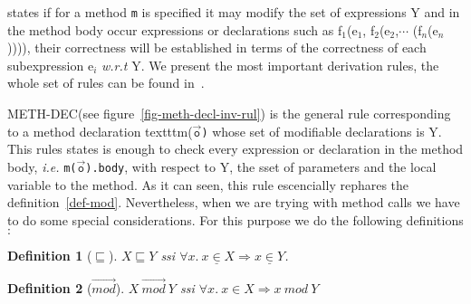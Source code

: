 \documentclass[a4paper]{llncs}
\newtheorem {df}{Definition}
\begin{document}
states if for a method \texttt{m} is specified it may modify the set
of expressions \textsc{Y} and in the method body occur expressions or
declarations such as \textup{f}$_1$\textup{(e}$_1$\textup{,
f}$_2$\textup{(e}$_2$\textup{,}$\cdots$
\textup{(f}$_n$\textup{(e}$_n$\textup{))))}, their correctness will be
established in terms of the correctness of each subexpression
\textup{e}$_i$ \emph{w.r.t} \textsc{Y}. We present the most important
derivation rules, the whole set of rules can be found
in~\cite{Cat01}. 

\textsc{METH-DEC}(see figure~\ref{fig-meth-decl-inv-rul}) is the
general rule corresponding to a method declaration
texttt{m(}$\overrightarrow{\texttt{o}}$\texttt{)} whose set of
modifiable declarations is \textsc{Y}. This rules states is enough to
check every expression or declaration in the method body, \emph{i.e.}
\texttt{m(}$\overrightarrow{\texttt{o}}$\texttt{).body}, with respect
to \textsc{Y}, the sset of parameters and the local variable to the
method. As it can seen, this rule escencially rephares the
definition~\ref{def-mod}. Nevertheless, when we are trying with method
calls we have to do some special considerations. For this purpose we
do the following definitions$:$
\begin{df}[$\sqsubseteq$]
\label{def-subseq}
$X \sqsubseteq Y$ ssi $\forall x.\ x\underline{\in}X\Rightarrow x\underline\in Y$. 
\end{df}

\begin{df}[$\overrightarrow{mod}$]
\label{def-mod-lis}
$X\ \overrightarrow{mod}\ Y$ ssi $\forall x.\ x\in X\Rightarrow x\ mod\ Y$
\end{df}
\end{document}
